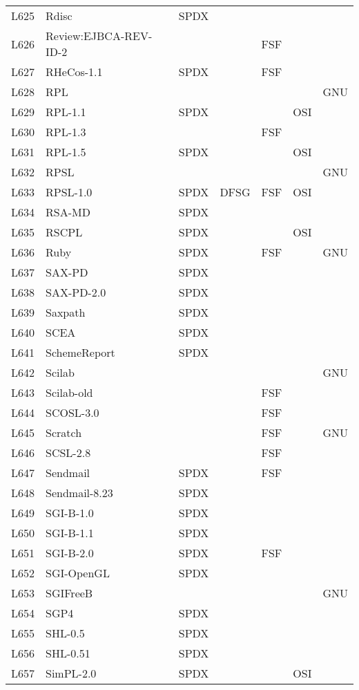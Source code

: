 \begin{longtable}[h]{m{2cm} | m{7cm} | c | c | c | c | c}
  L625 & Rdisc & SPDX &  &  &  &  \\
  L626 & Review:EJBCA-REV-ID-2 &  &  & FSF &  &  \\
  L627 & RHeCos-1.1 & SPDX &  & FSF &  &  \\
  L628 & RPL &  &  &  &  & GNU \\
  L629 & RPL-1.1 & SPDX &  &  & OSI &  \\
  L630 & RPL-1.3 &  &  & FSF &  &  \\
  L631 & RPL-1.5 & SPDX &  &  & OSI &  \\
  L632 & RPSL &  &  &  &  & GNU \\
  L633 & RPSL-1.0 & SPDX & DFSG & FSF & OSI &  \\
  L634 & RSA-MD & SPDX &  &  &  &  \\
  L635 & RSCPL & SPDX &  &  & OSI &  \\
  L636 & Ruby & SPDX &  & FSF &  & GNU \\
  L637 & SAX-PD & SPDX &  &  &  &  \\
  L638 & SAX-PD-2.0 & SPDX &  &  &  &  \\
  L639 & Saxpath & SPDX &  &  &  &  \\
  L640 & SCEA & SPDX &  &  &  &  \\
  L641 & SchemeReport & SPDX &  &  &  &  \\
  L642 & Scilab &  &  &  &  & GNU \\
  L643 & Scilab-old &  &  & FSF &  &  \\
  L644 & SCOSL-3.0 &  &  & FSF &  &  \\
  L645 & Scratch &  &  & FSF &  & GNU \\
  L646 & SCSL-2.8 &  &  & FSF &  &  \\
  L647 & Sendmail & SPDX &  & FSF &  &  \\
  L648 & Sendmail-8.23 & SPDX &  &  &  &  \\
  L649 & SGI-B-1.0 & SPDX &  &  &  &  \\
  L650 & SGI-B-1.1 & SPDX &  &  &  &  \\
  L651 & SGI-B-2.0 & SPDX &  & FSF &  &  \\
  L652 & SGI-OpenGL & SPDX &  &  &  &  \\
  L653 & SGIFreeB &  &  &  &  & GNU \\
  L654 & SGP4 & SPDX &  &  &  &  \\
  L655 & SHL-0.5 & SPDX &  &  &  &  \\
  L656 & SHL-0.51 & SPDX &  &  &  &  \\
  L657 & SimPL-2.0 & SPDX &  &  & OSI &  \\

\end{longtable}

